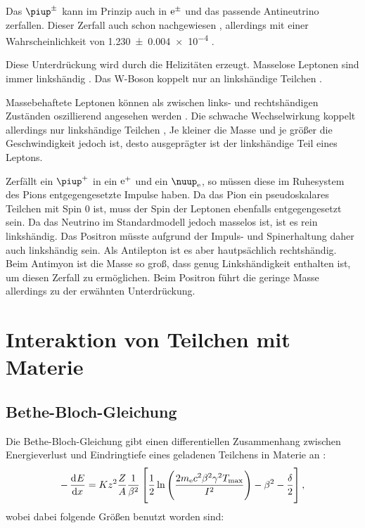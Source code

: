 \documentclass[11pt, ngerman, fleqn, DIV=15, headinclude, BCOR=2cm]{scrreprt}
\begin{document}
Das $\piup^\pm$ kann im Prinzip auch in $\mathrm e^\pm$ und das passende
Antineutrino zerfallen. Dieser Zerfall auch schon nachgewiesen
\parencite{Fazzini/Electron_Pion}, allerdings mit einer Wahrscheinlichkeit von
\num{1.230 +- 0.004 e-4}
\parencite[3]{Amsler/Pi_pm}.

Diese Unterdrückung wird durch die Helizitäten erzeugt. Masselose Leptonen sind
immer linkshändig \parencite{Wikipedia/Pion}. Das W-Boson koppelt nur an
linkshändige Teilchen \parencite[156]{Povh/Teilchen_Kerne}.

Massebehaftete Leptonen können als zwischen links- und rechtshändigen Zuständen
oszillierend angesehen werden \parencite[Fig.~25.1]{penrose-road_to_reality}.
Die schwache Wechselwirkung koppelt allerdings nur linkshändige Teilchen
\parencite[Fig.~25.4]{penrose-road_to_reality}, Je kleiner die Masse und je
größer die Geschwindigkeit jedoch ist, desto ausgeprägter ist der linkshändige
Teil eines Leptons.

Zerfällt ein $\piup^+$ in ein $\mathrm e^+$ und ein $\nuup_\eup$, so müssen diese im
Ruhesystem des Pions entgegengesetzte Impulse haben. Da das Pion ein
pseudoskalares Teilchen mit Spin 0 ist, muss der Spin der Leptonen ebenfalls
entgegengesetzt sein. Da das Neutrino im Standardmodell jedoch masselos ist,
ist es rein linkshändig. Das Positron müsste aufgrund der Impuls- und
Spinerhaltung daher auch linkshändig sein. Als Antilepton ist es aber
hautpsächlich rechtshändig. Beim Antimyon ist die Masse so groß, dass genug
Linkshändigkeit enthalten ist, um diesen Zerfall zu ermöglichen. Beim Positron
führt die geringe Masse allerdings zu der erwähnten Unterdrückung.

\section{Interaktion von Teilchen mit Materie}

\subsection{Bethe-Bloch-Gleichung}
\label{sec:bethe-bloch}

Die Bethe-Bloch-Gleichung gibt einen differentiellen Zusammenhang zwischen
Energieverlust und Eindringtiefe eines geladenen Teilchens in Materie an
\parencite[(4.6)]{Grupen/Astroteilchenphysik}:
\[
    - \dod Ex = K z^2 \frac ZA \frac{1}{\beta^2} \sbr{\frac 12
        \ln\del{\frac{2m_\text e c^2 \beta^2 \gamma^2 T_\text{max}}{I^2}} -
    \beta^2 - \frac\delta2},
\]
wobei dabei folgende Größen benutzt worden sind:
\end{document}
